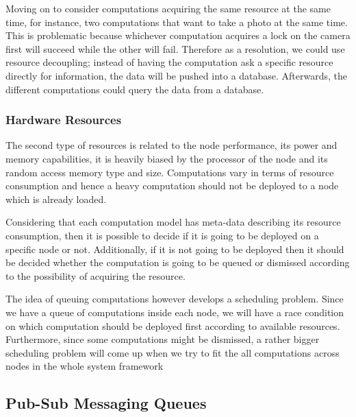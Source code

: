   Moving on to consider computations acquiring the same resource at the same time, for instance, two computations that want to take a photo at the same time. This is problematic because whichever computation acquires a lock on the camera first will succeed while the other will fail. Therefore as a resolution, we could use resource decoupling; instead of having the computation ask a specific resource directly for information, the  data will be pushed into a database. Afterwards, the different computations could query the data from a database.
  
  

\subsubsection{Hardware Resources }

The second type of resources is related to the node performance, its power and memory capabilities, it is heavily biased by the processor of the node and its random access memory type and size. Computations vary in terms of resource consumption and hence a heavy computation should not be deployed to a node which is already loaded. 

Considering that each computation model has meta-data describing its resource consumption, then it is possible to decide if it is going to be deployed on a specific node or not. Additionally, if it is not going to be deployed then it should be decided whether the computation is going to be queued or dismissed according to the possibility of acquiring the resource.

The idea of queuing computations however develops a scheduling problem. Since we have a queue of computations inside each node, we will have a race condition on which computation should be deployed first according to available resources. Furthermore, since some computations might be dismissed, a rather bigger scheduling problem will come up when we try to fit the all computations across nodes in the whole system framework 
\newpage




\subsection{Pub-Sub Messaging Queues}

